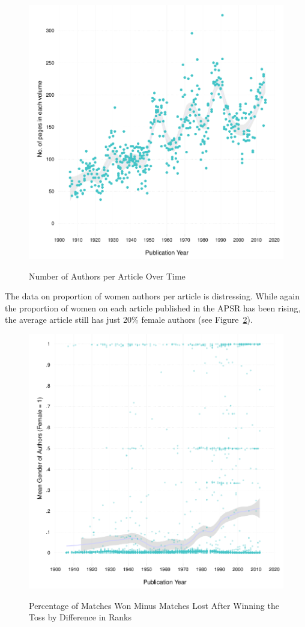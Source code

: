 \documentclass[11pt]{article}
\begin{document}
\begin{figure}[htbp]
\centering
\caption{Number of Authors per Article Over Time}
\includegraphics[scale=.85]{../figs/pages_per_issue_over_time.pdf}
\label{fig:nauthors}
\end{figure}

The data on proportion of women authors per article is distressing. While again the proportion of women on each article published in the APSR has been rising, the average article still has just 20\% female authors (see Figure~\ref{fig:women}).  

\begin{figure}[htbp]
\centering
\caption{Percentage of Matches Won Minus Matches Lost After Winning the Toss by Difference in Ranks}
\includegraphics[scale=.85]{../figs/gender_authors_per_article_over_time.pdf}
\label{fig:women}
\end{figure}
\end{document}
